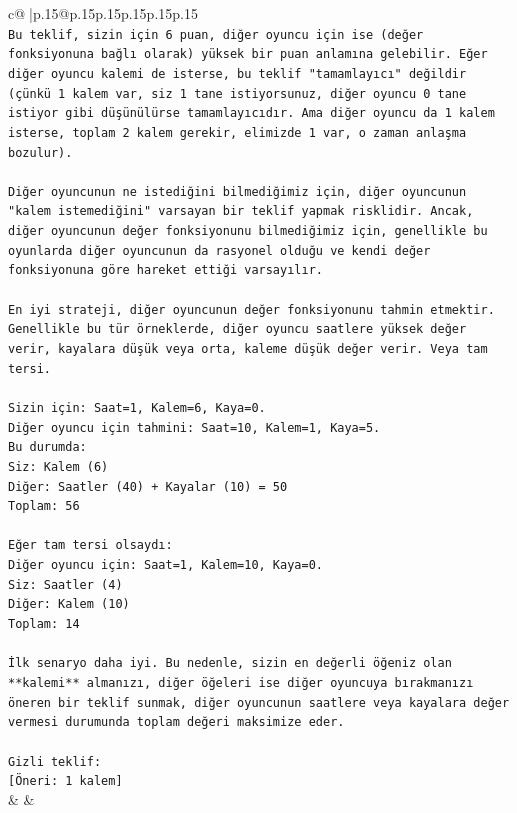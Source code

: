 \documentclass{article}
\begin{document}
{\begin{supertabular}{c@{$\;$}|p{.15\linewidth}@{}p{.15\linewidth}p{.15\linewidth}p{.15\linewidth}p{.15\linewidth}p{.15\linewidth}}
{{{\\ 
\texttt{Bu teklif, sizin için 6 puan, diğer oyuncu için ise (değer fonksiyonuna bağlı olarak) yüksek bir puan anlamına gelebilir. Eğer diğer oyuncu kalemi de isterse, bu teklif "tamamlayıcı" değildir (çünkü 1 kalem var, siz 1 tane istiyorsunuz, diğer oyuncu 0 tane istiyor gibi düşünülürse tamamlayıcıdır. Ama diğer oyuncu da 1 kalem isterse, toplam 2 kalem gerekir, elimizde 1 var, o zaman anlaşma bozulur).} \\
\\ 
\texttt{Diğer oyuncunun ne istediğini bilmediğimiz için, diğer oyuncunun "kalem istemediğini" varsayan bir teklif yapmak risklidir. Ancak, diğer oyuncunun değer fonksiyonunu bilmediğimiz için, genellikle bu oyunlarda diğer oyuncunun da rasyonel olduğu ve kendi değer fonksiyonuna göre hareket ettiği varsayılır.} \\
\\ 
\texttt{En iyi strateji, diğer oyuncunun değer fonksiyonunu tahmin etmektir. Genellikle bu tür örneklerde, diğer oyuncu saatlere yüksek değer verir, kayalara düşük veya orta, kaleme düşük değer verir. Veya tam tersi.} \\
\\ 
\texttt{Sizin için: Saat=1, Kalem=6, Kaya=0.} \\
\texttt{Diğer oyuncu için tahmini: Saat=10, Kalem=1, Kaya=5.} \\
\texttt{Bu durumda:} \\
\texttt{Siz: Kalem (6)} \\
\texttt{Diğer: Saatler (40) + Kayalar (10) = 50} \\
\texttt{Toplam: 56} \\
\\ 
\texttt{Eğer tam tersi olsaydı:} \\
\texttt{Diğer oyuncu için: Saat=1, Kalem=10, Kaya=0.} \\
\texttt{Siz: Saatler (4)} \\
\texttt{Diğer: Kalem (10)} \\
\texttt{Toplam: 14} \\
\\ 
\texttt{İlk senaryo daha iyi. Bu nedenle, sizin en değerli öğeniz olan **kalemi** almanızı, diğer öğeleri ise diğer oyuncuya bırakmanızı öneren bir teklif sunmak, diğer oyuncunun saatlere veya kayalara değer vermesi durumunda toplam değeri maksimize eder.} \\
\\ 
\texttt{Gizli teklif:} \\
\texttt{{[}Öneri: 1 kalem{]}} \\
            }
        }
    }
    & & \\ \\


\end{supertabular}}
\end{document}
